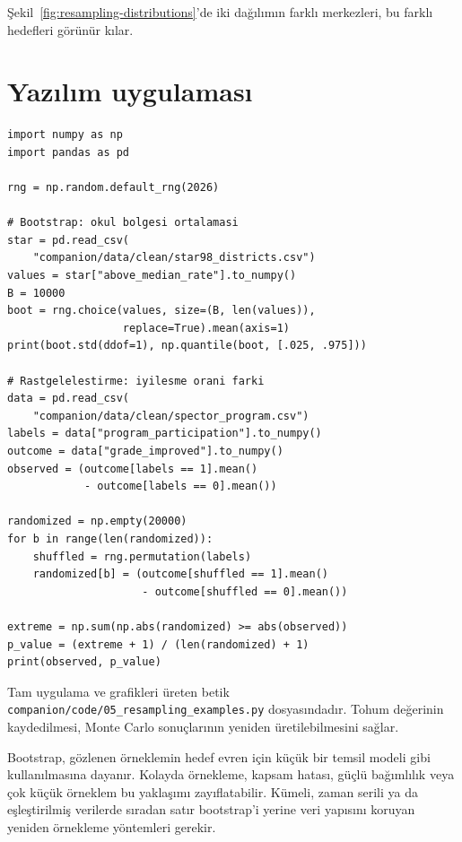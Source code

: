 Şekil~\ref{fig:resampling-distributions}'de iki dağılımın farklı merkezleri,
bu farklı hedefleri görünür kılar.

\section{Yazılım uygulaması}

\begin{softwarebox}
\begin{lstlisting}
import numpy as np
import pandas as pd

rng = np.random.default_rng(2026)

# Bootstrap: okul bolgesi ortalamasi
star = pd.read_csv(
    "companion/data/clean/star98_districts.csv")
values = star["above_median_rate"].to_numpy()
B = 10000
boot = rng.choice(values, size=(B, len(values)),
                  replace=True).mean(axis=1)
print(boot.std(ddof=1), np.quantile(boot, [.025, .975]))

# Rastgelelestirme: iyilesme orani farki
data = pd.read_csv(
    "companion/data/clean/spector_program.csv")
labels = data["program_participation"].to_numpy()
outcome = data["grade_improved"].to_numpy()
observed = (outcome[labels == 1].mean()
            - outcome[labels == 0].mean())

randomized = np.empty(20000)
for b in range(len(randomized)):
    shuffled = rng.permutation(labels)
    randomized[b] = (outcome[shuffled == 1].mean()
                     - outcome[shuffled == 0].mean())

extreme = np.sum(np.abs(randomized) >= abs(observed))
p_value = (extreme + 1) / (len(randomized) + 1)
print(observed, p_value)
\end{lstlisting}
Tam uygulama ve grafikleri üreten betik
\texttt{companion/code/05\_resampling\_examples.py} dosyasındadır. Tohum
değerinin kaydedilmesi, Monte Carlo sonuçlarının yeniden üretilebilmesini
sağlar.
\end{softwarebox}




\begin{assumptionbox}
Bootstrap, gözlenen örneklemin hedef evren için küçük bir temsil modeli gibi
kullanılmasına dayanır. Kolayda örnekleme, kapsam hatası, güçlü bağımlılık veya
çok küçük örneklem bu yaklaşımı zayıflatabilir. Kümeli, zaman serili ya da
eşleştirilmiş verilerde sıradan satır bootstrap'i yerine veri yapısını koruyan
yeniden örnekleme yöntemleri gerekir.
\end{assumptionbox}

